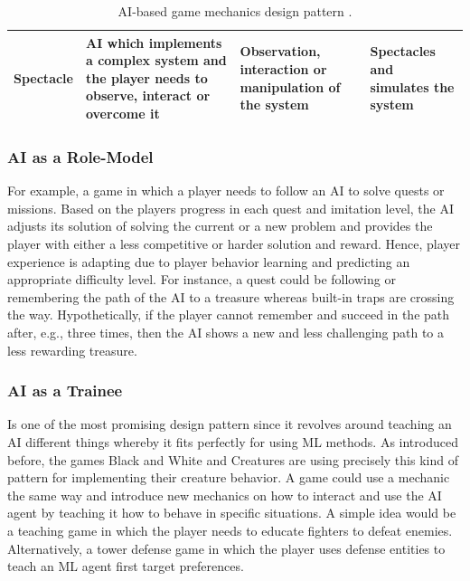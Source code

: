 \documentclass[MGS,Master,english]{twbook}%
\begin{document}
\begin{table}[!ht]
{\begin{tabular}{|p{2.1cm}||p{8cm}|p{4cm}|p{4cm}|}
			\textbf{Spectacle} & \ac{AI} which implements a complex system and the player needs to observe, interact or overcome it & Observation, interaction or manipulation of the system & Spectacles and simulates the system \\ \hline
		\end{tabular}%
	}
	\caption{\ac{AI}-based game mechanics design pattern \protect\cite{ai::aiBasedGameDesignPattern}.}
	\label{AI-basedMechanicsDesignPattern}
\end{table}

\subsubsection{\acl{AI} as a Role-Model}
For example, a game in which a player needs to follow an \ac{AI} to solve quests or missions. Based on the players progress in each quest and imitation level, the \ac{AI} adjusts its solution of solving the current or a new problem and provides the player with either a less competitive or harder solution and reward. Hence, player experience is adapting due to player behavior learning and predicting an appropriate difficulty level. For instance, a quest could be following or remembering the path of the \ac{AI} to a treasure whereas built-in traps are crossing the way. Hypothetically, if the player cannot remember and succeed in the path after, e.g., three times, then the \ac{AI} shows a new and less challenging path to a less rewarding treasure.

\subsubsection{\acl{AI} as a Trainee}
Is one of the most promising design pattern since it revolves around teaching an \ac{AI} different things whereby it fits perfectly for using \ac{ML} methods. As introduced before, the games Black and White and Creatures are using precisely this kind of pattern for implementing their creature behavior. A game could use a mechanic the same way and introduce new mechanics on how to interact and use the \ac{AI} agent by teaching it how to behave in specific situations. A simple idea would be a teaching game in which the player needs to educate fighters to defeat enemies. Alternatively, a tower defense game in which the player uses defense entities to teach an \ac{ML} agent first target preferences.
	
\end{document}
